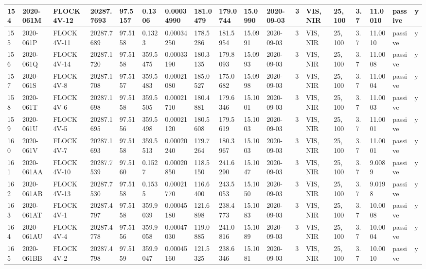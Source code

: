 \documentclass[12pt,a4paper,notitlepage,twoside,openright]{report}
\begin{document}
\begin{longtable}{|l|l|l|l|l|l|l|l|l|l|l|l|l|l|l|l|l|l|}
        154 & 2020-061M & FLOCK 4V-12 & 20287.7693 & 97.5157 & 0.1306 & 0.00034990 & 181.0479 & 179.0744 & 15.0990 & 2020-09-03 & 3 & VIS, NIR & 25, 100 & 3.7 & 11.0010 & passive & y \\ \hline
        155 & 2020-061P & FLOCK 4V-11 & 20287.7689 & 97.5158 & 0.1323 & 0.00034250 & 178.5286 & 181.5954 & 15.0991 & 2020-09-03 & 3 & VIS, NIR & 25, 100 & 3.7 & 11.0010 & passive & y \\ \hline
        156 & 2020-061Q & FLOCK 4V-14 & 20287.1720 & 97.5158 & 359.5475 & 0.00033190 & 180.3135 & 179.8093 & 15.0993 & 2020-09-03 & 3 & VIS, NIR & 25, 100 & 3.7 & 11.0008 & passive & y \\ \hline
        157 & 2020-061S & FLOCK 4V-8 & 20287.1708 & 97.5157 & 359.5483 & 0.00021080 & 185.0527 & 175.0682 & 15.0998 & 2020-09-03 & 3 & VIS, NIR & 25, 100 & 3.7 & 11.0004 & passive & y \\ \hline
        158 & 2020-061T & FLOCK 4V-6 & 20287.1698 & 97.5158 & 359.5505 & 0.00021710 & 180.4881 & 179.6346 & 15.1001 & 2020-09-03 & 3 & VIS, NIR & 25, 100 & 3.7 & 11.0003 & passive & y \\ \hline
        159 & 2020-061U & FLOCK 4V-5 & 20287.1695 & 97.5156 & 359.5498 & 0.00021120 & 180.5608 & 179.5619 & 15.1003 & 2020-09-03 & 3 & VIS, NIR & 25, 100 & 3.7 & 11.0001 & passive & y \\ \hline
        160 & 2020-061V & FLOCK 4V-7 & 20287.1693 & 97.5158 & 359.5513 & 0.00020240 & 179.7264 & 180.3967 & 15.1003 & 2020-09-03 & 3 & VIS, NIR & 25, 100 & 3.7 & 11.0001 & passive & y \\ \hline
        161 & 2020-061AA & FLOCK 4V-10 & 20287.7539 & 97.5160 & 0.1527 & 0.00020850 & 118.5150 & 241.6290 & 15.1047 & 2020-09-03 & 3 & VIS, NIR & 25, 100 & 3.7 & 9.0089 & passive & y \\ \hline
        162 & 2020-061AB & FLOCK 4V-13 & 20287.7530 & 97.5158 & 0.1535 & 0.00021770 & 116.6400 & 243.5053 & 15.1050 & 2020-09-03 & 3 & VIS, NIR & 25, 100 & 3.7 & 9.0198 & passive & y \\ \hline
        163 & 2020-061AT & FLOCK 4V-1 & 20287.4797 & 97.5158 & 359.9039 & 0.00045180 & 121.6898 & 238.4773 & 15.1083 & 2020-09-03 & 3 & VIS, NIR & 25, 100 & 3.7 & 10.0008 & passive & y \\ \hline
        164 & 2020-061AU & FLOCK 4V-4 & 20287.4778 & 97.5156 & 359.9058 & 0.00047030 & 119.0885 & 241.0816 & 15.1089 & 2020-09-03 & 3 & VIS, NIR & 25, 100 & 3.7 & 10.0004 & passive & y \\ \hline
        165 & 2020-061BB & FLOCK 4V-2 & 20287.4798 & 97.5159 & 359.9047 & 0.00045160 & 121.5325 & 238.6346 & 15.1081 & 2020-09-03 & 3 & VIS, NIR & 25, 100 & 3.7 & 10.0010 & passive & y \\ \hline

\end{longtable}
\end{document}
